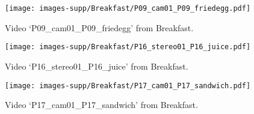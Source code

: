 \documentclass[10pt,twocolumn,letterpaper]{article}
\begin{document}
\begin{figure}[h]
\vspace{-0.3cm}
\begin{center}
   \texttt{[image: images-supp/Breakfast/P09\_cam01\_P09\_friedegg.pdf]}
\end{center}
   \caption{Video `P09\_cam01\_P09\_friedegg' from Breakfast.}
\label{fig:Breakfast-4}
\end{figure}

\begin{figure}[h]
\vspace{-0.3cm}
\begin{center}
   \texttt{[image: images-supp/Breakfast/P16\_stereo01\_P16\_juice.pdf]}
\end{center}
   \caption{Video `P16\_stereo01\_P16\_juice' from Breakfast.}
\label{fig:Breakfast-5}
\end{figure}

\begin{figure}[h]
\vspace{-0.3cm}
\begin{center}
   \texttt{[image: images-supp/Breakfast/P17\_cam01\_P17\_sandwich.pdf]}
\end{center}
   \caption{Video `P17\_cam01\_P17\_sandwich' from Breakfast.}
\label{fig:Breakfast-6}
\end{figure}
\end{document}
